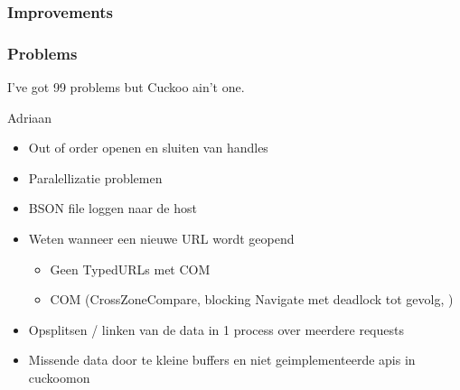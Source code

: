 \restoregeometry
\subsubsection{Improvements}




\subsubsection{Problems}
\label{99problems}
\epigraph{I've got 99 problems but Cuckoo ain't one.}{Adriaan}

\begin{itemize}
\item Out of order openen en sluiten van handles 
\item Paralellizatie problemen
\item BSON file loggen naar de host
\item Weten wanneer een nieuwe URL wordt geopend
\begin{itemize}
\item Geen TypedURLs met COM
\item COM (CrossZoneCompare, blocking Navigate met deadlock tot gevolg, )
\end{itemize}
\item Opsplitsen / linken van de data in 1 process over meerdere requests
\item Missende data door te kleine buffers en niet geimplementeerde apis in cuckoomon
\end{itemize}
